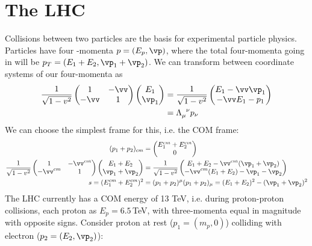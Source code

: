 \documentclass[a4paper, 11pt, normalem]{report}
\begin{document}
\chapter{The LHC}
Collisions between two particles are the basis for experimental particle physics.
Particles have four -momenta $p=(E_p,\vp)$, where the total four-momenta going in will be $p_T=(E_1+E_2,\vp_1+\vp_2)$.
We can transform between coordinate systems of our four-momenta as
\begin{align}
    \frac{1}{\sqrt{1-v^2}}\begin{pmatrix}1& -\vv \\ -\vv & 1\end{pmatrix}\begin{pmatrix} E_1 \\ \vp_1\end{pmatrix} &= \frac{1}{\sqrt{1-v^2}}\begin{pmatrix} E_1-\vv\vp_1 \\ -\vv E_1 - p_1\end{pmatrix} \\
                                          &= \tensor{\Lambda}{_\mu^\nu}p_\nu
\end{align}
We can choose the simplest frame for this, i.e. the COM frame:
\begin{align}
    (p_1+p_2)_{cm} &= \begin{pmatrix} E_1^{cm} + E_2^{cm} \\ 0 \end{pmatrix} \\
    \frac{1}{\sqrt{1-v^2}}\begin{pmatrix}1& -\vv^{cm} \\ -\vv^{cm} & 1\end{pmatrix}\begin{pmatrix} E_1 + E_2 \\ \vp_1 + \vp_2\end{pmatrix} &= \frac{1}{\sqrt{1-v^2}}\begin{pmatrix} E_1 + E_2 -\vv^{cm}(\vp_1+\vp_2) \\ -\vv^{cm}( E_1+E_2) - \vp_1-\vp_2\end{pmatrix}  \\
    s = (E_1^{cm}+E_2^{cm})^2 &= (p_1+p_2)^\mu(p_1+p_2)_\mu = (E_1+E_2)^2 - (\vp_1+\vp_2)^2
\end{align}
The LHC currently has a COM energy of 13 TeV, i.e. during proton-proton collisions, each proton as $E_p=6.5\,$TeV, with three-momenta equal in magnitude with opposite signs.
Consider proton at rest ($p_1=(m_p,0)$) colliding with electron ($p_2=(E_2,\vp_2)$):
\end{document}
